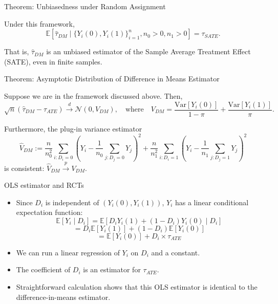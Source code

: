 \documentclass[11pt,aspectratio=169]{beamer}
\begin{document}
\begin{frame}{Theorem: Unbiasedness under Random Assignment}
\begin{theorembox}
Under this framework,
$$\mathbb{E}\left[\widehat{\tau}_{DM} \mid \{Y_i(0), Y_i(1)\}_{i=1}^n, n_0 > 0, n_1 > 0\right] = \tau_{SATE}.$$
\end{theorembox}
That is, $\widehat{\tau}_{DM}$ is an unbiased estimator of the Sample Average Treatment Effect (SATE), even in finite samples.
\end{frame}

\begin{frame}{Theorem: Asymptotic Distribution of Difference in Means Estimator}

\begin{theorembox}
Suppose we are in the framework discussed above. Then,
$$\sqrt{n}(\widehat{\tau}_{DM} - \tau_{ATE}) \xrightarrow{d} \mathcal{N}(0, V_{DM}), \quad \text{where} \quad V_{DM} = \frac{\text{Var}[Y_i(0)]}{1 - \pi} + \frac{\text{Var}[Y_i(1)]}{\pi}.$$

Furthermore, the plug-in variance estimator
$$\widehat{V}_{DM} := \frac{n}{n_0^2} \sum_{i:D_i=0} \left(Y_i - \frac{1}{n_0} \sum_{j:D_j=0} Y_j\right)^2 + \frac{n}{n_1^2} \sum_{i:D_i=1} \left(Y_i - \frac{1}{n_1} \sum_{j:D_j=1} Y_j\right)^2$$
is consistent: $\widehat{V}_{DM} \xrightarrow{p} V_{DM}$.
\end{theorembox}
\end{frame}




\begin{frame}{OLS estimator and RCTs}

\begin{itemize}
    \item Since $D_i$ is independent of $(Y_i(0), Y_i(1))$, $Y_i$ has a linear conditional expectation function:
    $$\mathbb{E}[Y_i \mid D_i] = \mathbb{E}[D_i Y_i(1) + (1 - D_i)Y_i(0) \mid D_i]$$
    $$= D_i\mathbb{E}[Y_i(1)] + (1 - D_i)\mathbb{E}[Y_i(0)]$$
    $$= \mathbb{E}[Y_i(0)] + D_i \times \tau_{ATE}$$
    \item We can run a linear regression of $Y_i$ on $D_i$ and a constant.
    \item The coefficient of $D_i$ is an estimator for $\tau_{ATE}$.
    \item Straightforward calculation shows that this OLS estimator is identical to the difference-in-means estimator.
\end{itemize}
\end{frame}
\end{document}

